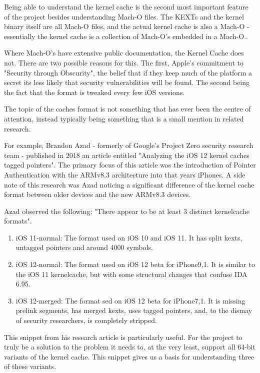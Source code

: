 Being able to understand the kernel cache is the second most important feature of the project besides understanding Mach-O files. The KEXTs and the kernel binary itself are all Mach-O files, and the actual kernel cache is also a Mach-O - essentially the kernel cache is a collection of Mach-O's embedded in a Mach-O.\cite{find-reference}.

Where Mach-O's have extensive public documentation, the Kernel Cache does not. There are two possible reasons for this. The first, Apple's commitment to "Security through Obscurity"\cite{security-through-obscurity}, the belief that if they keep much of the platform a secret its less likely that security vulnerabilities will be found. The second being the fact that the format is tweaked every few iOS versions.

The topic of the caches format is not something that has ever been the centre of attention, instead typically being something that is a small mention in related research.

For example, Brandon Azad - formerly of Google's Project Zero security research team - published in 2018 an article entitled "Analyzing the iOS 12 kernel caches tagged pointers"\cite{azad-tagged-pointers}. The primary focus of this article was the introduction of Pointer Authentication\cite{rutland-pac-slides} with the ARMv8.3 architecture into that years iPhones. A side note of this research was Azad noticing a significant difference of the kernel cache format between older devices and the new ARMv8.3 devices. 

Azad observed the following; "There appear to be at least 3 distinct kernelcache formats".

\begin{enumerate}
	\item iOS 11-normal: The format used on iOS 10 and iOS 11. It has split kexts, untagged pointers and around 4000 symbols.
	\item iOS 12-normal: The format used on iOS 12 beta for iPhone9,1. It is similar to the iOS 11 kernelcache, but with some structural changes that confuse IDA 6.95.
	\item iOS 12-merged: The format sed on iOS 12 beta for iPhone7,1. It is missing prelink segments, has merged kexts, uses tagged pointers, and, to the dismay of security researchers, is completely stripped.
\end{enumerate}
 
 This snippet from his research article is particularly useful. For the project to truly be a solution to the problem it needs to, at the very least, support all 64-bit variants of the kernel cache. This snippet gives us a basis for understanding three of these variants. 
 
